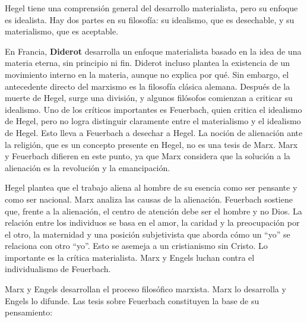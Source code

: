 \documentclass[
  a4paper,
]{article}
\begin{document}
Hegel tiene una comprensión general del desarrollo materialista, pero su
enfoque es idealista. Hay dos partes en su filosofía: su idealismo, que
es desechable, y su materialismo, que es aceptable.

En Francia, \textbf{Diderot} desarrolla un enfoque materialista basado
en la idea de una materia eterna, sin principio ni fin. Diderot incluso
plantea la existencia de un movimiento interno en la materia, aunque no
explica por qué. Sin embargo, el antecedente directo del marxismo es la
filosofía clásica alemana. Después de la muerte de Hegel, surge una
división, y algunos filósofos comienzan a criticar su idealismo. Uno de
los críticos importantes es Feuerbach, quien critica el idealismo de
Hegel, pero no logra distinguir claramente entre el materialismo y el
idealismo de Hegel. Esto lleva a Feuerbach a desechar a Hegel. La noción
de alienación ante la religión, que es un concepto presente en Hegel, no
es una tesis de Marx. Marx y Feuerbach difieren en este punto, ya que
Marx considera que la solución a la alienación es la revolución y la
emancipación.

Hegel plantea que el trabajo aliena al hombre de su esencia como ser
pensante y como ser nacional. Marx analiza las causas de la alienación.
Feuerbach sostiene que, frente a la alienación, el centro de atención
debe ser el hombre y no Dios. La relación entre los individuos se basa
en el amor, la caridad y la preocupación por el otro, la maternidad y
una posición subjetivista que aborda cómo un ``yo'' se relaciona con
otro ``yo''. Esto se asemeja a un cristianismo sin Cristo. Lo importante
es la crítica materialista. Marx y Engels luchan contra el
individualismo de Feuerbach.

Marx y Engels desarrollan el proceso filosófico marxista. Marx lo
desarrolla y Engels lo difunde. Las tesis sobre Feuerbach constituyen la
base de su pensamiento:
\end{document}
